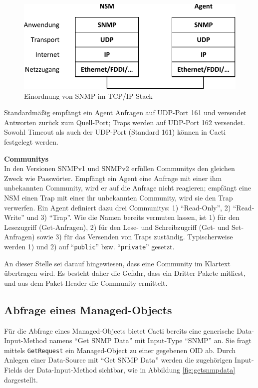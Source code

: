 \documentclass[12pt,ngerman,toc=listofnumbered,toc=bibliographynumbered,toc=index,headsepline=true]{scrbook}
\begin{document}
\begin{figure}[ht]
	\centering
	\includegraphics{bilder/tcpipstack}
	\caption{Einordnung von SNMP im TCP/IP-Stack}
	\label{fig:tcpipstack}
\end{figure}

Standardmäßig empfängt ein Agent Anfragen auf UDP-Port 161 und versendet
Antworten zurück zum Quell-Port; Traps werden auf UDP-Port 162 versendet. Sowohl
Timeout als auch der UDP-Port (Standard 161) können in Cacti festgelegt werden.

\textbf{Communitys}\\[1ex]
In den Versionen SNMPv1 und SNMPv2 erfüllen Communitys den gleichen Zweck wie
Passwörter. Empfängt ein Agent eine Anfrage mit einer ihm unbekannten Community,
wird er auf die Anfrage nicht reagieren; empfängt eine NSM einen Trap mit einer
ihr unbekannten Community, wird sie den Trap verwerfen. Ein Agent definiert dazu
drei Communitys: 1) \enquote{Read-Only}, 2) \enquote{Read-Write} und 3)
\enquote{Trap}. Wie die Namen bereits vermuten lassen, ist 1) für den
Lesezugriff (Get-Anfragen), 2) für den Lese- und Schreibzugriff (Get- und
Set-Anfragen) sowie 3) für das Versenden von Traps zuständig. Typischerweise
werden 1) und 2) auf \enquote{\texttt{public}} bzw. \enquote{\texttt{private}}
gesetzt.

An dieser Stelle sei darauf hingewiesen, dass eine Community im Klartext
übertragen wird. Es besteht daher die Gefahr, dass ein Dritter Pakete
mitliest, und aus dem Paket-Header die Community ermittelt. %


\subsection{Abfrage eines Managed-Objects}
Für die Abfrage eines Managed-Objects bietet Cacti bereits eine generische
Data-Input-Method namens \enquote{Get SNMP Data} mit Input-Type \enquote{SNMP}
an. Sie fragt mittels \texttt{GetRequest} ein Managed-Object zu einer gegebenen
OID ab. Durch Anlegen einer Data-Source mit \enquote{Get SNMP Data} werden die
zugehörigen Input-Fields der Data-Input-Method sichtbar, wie in Abbildung
\ref{fig:getsnmpdata} dargestellt.
\end{document}
